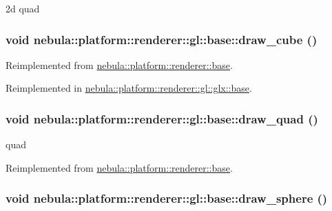 2d quad \hypertarget{classnebula_1_1platform_1_1renderer_1_1gl_1_1base_a4b143fe5c7fa7fe15dc0bf2f30630451}{
\subsubsection[{draw\_\-cube}]{\setlength{\rightskip}{0pt plus 5cm}void nebula::platform::renderer::gl::base::draw\_\-cube ()}}
\label{classnebula_1_1platform_1_1renderer_1_1gl_1_1base_a4b143fe5c7fa7fe15dc0bf2f30630451}


Reimplemented from \hyperlink{classnebula_1_1platform_1_1renderer_1_1base_a0da71c3c6f5ee8e7644594c424211271}{nebula::platform::renderer::base}.

Reimplemented in \hyperlink{classnebula_1_1platform_1_1renderer_1_1gl_1_1glx_1_1base_af6bfad8ac789393e50da7f32ea45817e}{nebula::platform::renderer::gl::glx::base}.\hypertarget{classnebula_1_1platform_1_1renderer_1_1gl_1_1base_acbfb1696354adcef364326a1864dc3fc}{
\subsubsection[{draw\_\-quad}]{\setlength{\rightskip}{0pt plus 5cm}void nebula::platform::renderer::gl::base::draw\_\-quad ()}}
\label{classnebula_1_1platform_1_1renderer_1_1gl_1_1base_acbfb1696354adcef364326a1864dc3fc}


quad 

Reimplemented from \hyperlink{classnebula_1_1platform_1_1renderer_1_1base_a5efb6122adb9602316c6c7aabbf87e1d}{nebula::platform::renderer::base}.\hypertarget{classnebula_1_1platform_1_1renderer_1_1gl_1_1base_a0c7b5d23095d7efe88dbfa57f2010b4a}{
\subsubsection[{draw\_\-sphere}]{\setlength{\rightskip}{0pt plus 5cm}void nebula::platform::renderer::gl::base::draw\_\-sphere ()}}
\label{classnebula_1_1platform_1_1renderer_1_1gl_1_1base_a0c7b5d23095d7efe88dbfa57f2010b4a}


